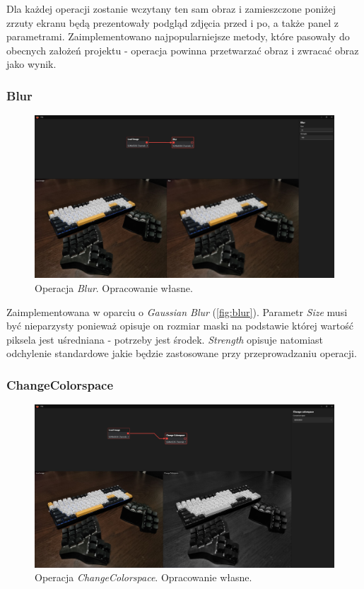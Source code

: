 Dla każdej operacji zostanie wczytany ten sam obraz i zamieszczone poniżej zrzuty ekranu będą prezentowały podgląd zdjęcia przed i po, a także panel z parametrami.
Zaimplementowano najpopularniejsze \cite{mostpop} metody, które pasowały do obecnych założeń projektu - operacja powinna przetwarzać obraz i zwracać obraz jako wynik.
\subsubsection{Blur}
\begin{figure}[H]
    \centering
    \includegraphics[width=1\linewidth]{images/Picture22.jpg}
    \caption{Operacja \textit{Blur}. Opracowanie własne.}
    \label{fig:blur}
\end{figure}

Zaimplementowana w oparciu o \textit{Gaussian Blur} \cite{gauss} (\autoref{fig:blur}). Parametr \textit{Size} musi być nieparzysty ponieważ opisuje on rozmiar maski na podstawie której wartość piksela jest uśredniana - potrzeby jest środek. \textit{Strength} opisuje natomiast odchylenie standardowe jakie będzie zastosowane przy przeprowadzaniu operacji.

\subsubsection{ChangeColorspace}

\begin{figure}[H]
    \centering
    \includegraphics[width=1\linewidth]{images/Picture23.jpg}
    \caption{Operacja \textit{ChangeColorspace}. Opracowanie własne.}
    \label{fig:colorconv}
\end{figure}

